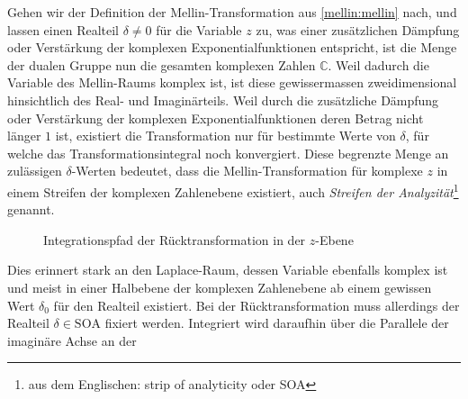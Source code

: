 Gehen wir der Definition der Mellin-Transformation aus 
\eqref{mellin:mellin} nach, und lassen einen Realteil $\delta \neq 0$ für 
die Variable $z$ zu, was einer zusätzlichen Dämpfung oder Verstärkung der 
komplexen Exponentialfunktionen entspricht, ist die Menge der dualen 
Gruppe nun die gesamten komplexen Zahlen $\mathbb{C}$.
Weil dadurch die Variable des Mellin-Raums komplex ist, ist diese 
gewissermassen zweidimensional hinsichtlich des Real- und Imaginärteils. 
Weil durch die zusätzliche Dämpfung oder Verstärkung der komplexen 
Exponentialfunktionen deren Betrag nicht länger $1$ ist, existiert die 
Transformation nur für bestimmte Werte von $\delta$, für welche das 
Transformationsintegral noch konvergiert.
Diese begrenzte Menge an zulässigen $\delta$-Werten bedeutet, dass die 
Mellin-Transformation für komplexe $z$ in einem Streifen der komplexen 
Zahlenebene existiert, auch {\em Streifen der Analyzität}\footnote{aus 
dem Englischen: strip of analyticity oder SOA} genannt.
\begin{figure}
    \centering
    \caption{Integrationspfad der Rücktransformation in der $z$-Ebene
    \label{fig:mellin:z}}
\end{figure}
Dies erinnert stark an den Laplace-Raum, dessen Variable ebenfalls komplex 
ist und meist in einer Halbebene der komplexen Zahlenebene ab einem 
gewissen Wert $\delta_0$ für den Realteil existiert.
Bei der Rücktransformation muss allerdings der Realteil 
$\delta \in \text{SOA}$ fixiert werden. 
Integriert wird daraufhin über die Parallele der imaginäre Achse an der 
